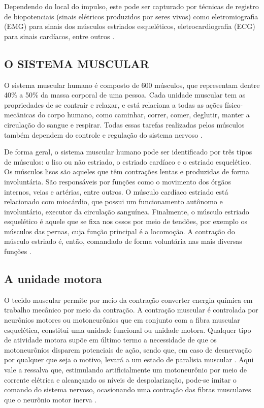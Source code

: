 Dependendo do local do impulso, este pode ser capturado por técnicas de registro de biopotenciais (sinais elétricos produzidos por seres vivos) como eletromiografia (\acrshort{EMG}) para sinais dos músculos estriados esqueléticos, eletrocardiografia (\acrshort{ECG}) para sinais cardíacos, entre outros \cite{Fonseca2015InstrumentacaoMedular}.

\subsection{O SISTEMA MUSCULAR}

O sistema muscular humano é composto de 600 músculos, que representam dentre 40\% a 50\% da massa corporal de uma pessoa. Cada unidade muscular tem as propriedades de se contrair e relaxar, e está relaciona a todas as ações físico-mecânicas do corpo humano, como caminhar, correr, comer, deglutir, manter a circulação do sangue e respirar. Todas essas tarefas realizadas pelos músculos também dependem do controle e regulação do sistema nervoso \cite{Vanputte2016AnatomiaSeeley}.

De forma geral, o sistema muscular humano pode ser identificado por três tipos de músculos: o liso ou não estriado, o estriado cardíaco e o estriado esquelético. Os músculos lisos são aqueles que têm contrações lentas e produzidas de forma involuntária. São responsáveis por funções como o movimento dos órgãos internos, veias e artérias, entre outros. O músculo cardíaco estriado está relacionado com miocárdio, que possui um funcionamento autônomo e involuntário, executor da circulação sanguínea. Finalmente, o músculo estriado esquelético é aquele que se fixa nos ossos por meio de tendões, por exemplo os músculos das pernas, cuja função principal é a locomoção. A contração do músculo estriado é, então, comandado de forma voluntária nas mais diversas funções \cite{Geraldo2007AnatomiaSegmentar}. 

\subsection*{A unidade motora}

O tecido muscular permite por meio da contração converter energia química em trabalho mecânico por meio da contração. A contração muscular é controlada por neurônios motores ou motoneurônios que em conjunto com a fibra muscular esquelética, constitui uma unidade funcional ou unidade motora. Qualquer tipo de atividade motora supõe em último termo a necessidade de que os motoneurônios disparem potenciais de ação, sendo que, em caso de desnervação por qualquer que seja o motivo, levará a um estado de paralisia muscular \cite{Jones2004SkeletalMuscle}. Aqui vale a ressalva que, estimulando artificialmente um motoneurônio por meio de corrente elétrica e alcançando os níveis de despolarização, pode-se imitar o comando do sistema nervoso, ocasionando uma contração das fibras musculares que o neurônio motor inerva \cite{Lent2002CemNeuronios}.

